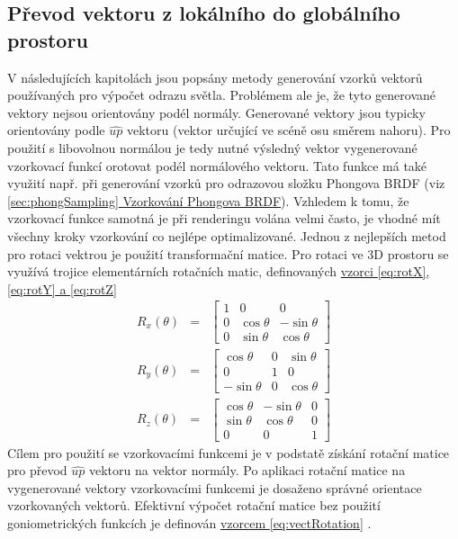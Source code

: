 \documentclass[czech,master,dept460,male,cpp,cpdeclaration]{diploma}
\newcommand{\uvec}[1]{\hat{#1}}
\begin{document}
\subsection{Převod vektoru z lokálního do globálního prostoru}
V následujících kapitolách jsou popsány metody generování vzorků vektorů používaných pro výpočet odrazu světla. Problémem ale je, že tyto generované vektory nejsou orientovány podél normály. Generované vektory jsou typicky orientovány podle $\uvec{up}$ vektoru (vektor určující ve scéně osu směrem nahoru). Pro použití s libovolnou normálou je tedy nutné výsledný vektor vygenerované vzorkovací funkcí orotovat podél normálového vektoru. Tato funkce má také využití např. při generování vzorků pro odrazovou složku Phongova BRDF (viz \hyperref[sec:phongSampling]{\ref{sec:phongSampling} Vzorkování Phongova BRDF}). Vzhledem k tomu, že vzorkovací funkce samotná je při renderingu volána velmi často, je vhodné mít všechny kroky vzorkování co nejlépe optimalizované. Jednou z nejlepších metod pro rotaci vektrou je použití transformační matice. Pro rotaci ve 3D prostoru se využívá trojice elementárních rotačních matic, definovaných \hyperref[eq:rotX]{vzorci \ref{eq:rotX}, \ref{eq:rotY} a \ref{eq:rotZ}} \cite{HughesDamEtAl13}
\begin{eqnarray}
    R_x(\theta) & = & \begin{bmatrix}
        1 & 0          & 0           \\
        0 & \cos\theta & -\sin\theta \\
        0 & \sin\theta & \cos\theta
    \end{bmatrix} \label{eq:rotX} \\
    R_y(\theta) & = & \begin{bmatrix}
        \cos\theta  & 0 & \sin\theta \\
        0           & 1 & 0          \\
        -\sin\theta & 0 & \cos\theta
    \end{bmatrix} \label{eq:rotY} \\
    R_z(\theta) & = & \begin{bmatrix}
        \cos\theta & -\sin\theta & 0 \\
        \sin\theta & \cos\theta  & 0 \\
        0          & 0           & 1
    \end{bmatrix}\label{eq:rotZ}
\end{eqnarray}
Cílem pro použití se vzorkovacími funkcemi je v podstatě získání rotační matice pro převod $\uvec{up}$ vektoru na vektor normály. Po aplikaci rotační matice na vygenerované vektory vzorkovacími funkcemi je dosaženo správné orientace vzorkovaných vektorů.  Efektivní výpočet rotační matice bez použití goniometrických funkcích je definován \hyperref[eq:vectRotation]{vzorcem \ref{eq:vectRotation}} \cite{MollerHughesVectRotation}.
\end{document}
